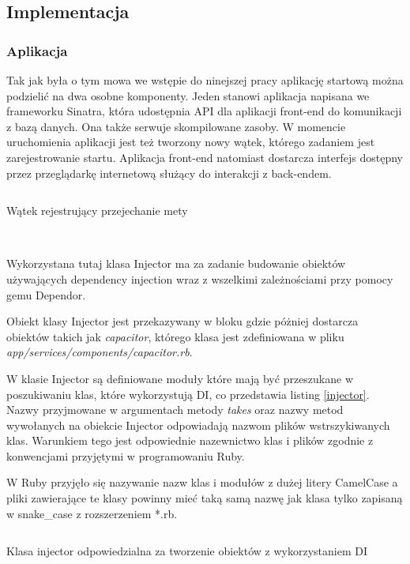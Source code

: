 \documentclass[11pt,a4paper, twoside]{article}
\begin{document}
\subsection{Implementacja}
\subsubsection{Aplikacja}
Tak jak była o tym mowa we wstępie do ninejszej pracy aplikację startową można podzielić na dwa osobne komponenty. Jeden stanowi aplikacja napisana we frameworku Sinatra, która udostępnia API dla aplikacji front-end do komunikacji z bazą danych. Ona także serwuje skompilowane zasoby. W momencie uruchomienia aplikacji jest też tworzony nowy wątek, którego zadaniem jest zarejestrowanie startu. 
	Aplikacja front-end natomiast dostarcza interfejs dostępny przez przeglądarkę internetową służący do interakcji z back-endem.
\begin{listing}[H]
\inputminted[linenos=true]{ruby}{./src/thread.rb}
\caption{Wątek rejestrujący przejechanie mety}
$\label{thread}$
\end{listing}
\newpage
Wykorzystana tutaj klasa Injector ma za zadanie budowanie obiektów używających dependency injection wraz z wszelkimi zależnościami przy pomocy gemu Dependor. 


Obiekt klasy Injector jest 	przekazywany w bloku gdzie póżniej dostarcza obiektów takich jak \emph{capacitor}, którego klasa jest zdefiniowana w pliku \emph{app/services/components/capacitor.rb}. 

W klasie Injector są definiowane moduły które mają być przeszukane w poszukiwaniu klas, które wykorzystują DI, co przedstawia listing \ref{injector}. Nazwy przyjmowane w argumentach metody \emph{takes} oraz nazwy metod wywołanych na obiekcie Injector odpowiadają nazwom plików wstrszykiwanych klas. Warunkiem tego jest odpowiednie nazewnictwo klas i plików zgodnie z konwencjami przyjętymi w programowaniu Ruby.

W Ruby przyjęło się nazywanie nazw klas i modułów z dużej litery \mbox{CamelCase} a pliki zawierające te klasy powinny mieć taką samą nazwę jak klasa tylko zapisaną w snake\_case z rozszerzeniem *.rb.
\begin{listing}[H]
\inputminted[linenos=true]{ruby}{./src/injector.rb}
\caption{Klasa injector odpowiedzialna za tworzenie obiektów z wykorzystaniem DI}
$\label{injector}$
\end{listing}
\end{document}
